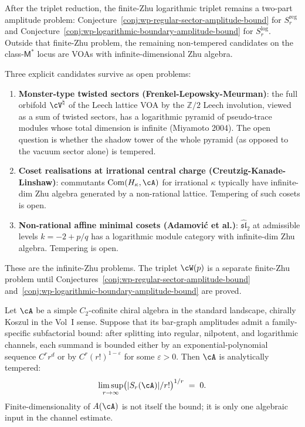 \begin{remark}
\label{rem:non-tempered-frontier-unbounded-zhu}
After the triplet reduction, the finite-Zhu logarithmic triplet remains
a two-part amplitude problem:
Conjecture~\ref{conj:wp-regular-sector-amplitude-bound} for
$S_r^{\mathrm{reg}}$ and
Conjecture~\ref{conj:wp-logarithmic-boundary-amplitude-bound} for
$S_r^{\log}$. Outside that finite-Zhu problem, the remaining
non-tempered candidates on the class-$\mathsf{M}^*$ locus are VOAs
with infinite-dimensional Zhu algebra.

Three explicit candidates survive as open problems:
\begin{enumerate}[nosep]
\item \textbf{Monster-type twisted sectors (Frenkel-Lepowsky-Meurman)}:
 the full orbifold $\cV^\natural$ of the Leech lattice VOA by the
 $\mathbb{Z} / 2$ Leech involution, viewed as a sum of twisted sectors,
 has a logarithmic pyramid of pseudo-trace modules whose total
 dimension is infinite (Miyamoto 2004). The open question
 is whether the shadow tower of the whole pyramid (as opposed to
 the vacuum sector alone) is tempered.
\item \textbf{Coset realisations at irrational central charge
 (Creutzig-Kanade-Linshaw)}: commutants
 $\mathrm{Com}(H_{\kappa}, \cA)$ for irrational $\kappa$ typically
 have infinite-dim Zhu algebra generated by a non-rational lattice.
 Tempering of such cosets is open.
\item \textbf{Non-rational affine minimal cosets
 (Adamovi\'c et al.)}: $\widehat{\mathfrak{sl}}_2$ at admissible
 levels $k = -2 + p/q$ has a logarithmic module category with
 infinite-dim Zhu algebra. Tempering is open.
\end{enumerate}
These are the infinite-Zhu problems. The triplet $\cW(p)$ is a
separate finite-Zhu problem until
Conjectures~\ref{conj:wp-regular-sector-amplitude-bound}
and~\ref{conj:wp-logarithmic-boundary-amplitude-bound} are proved.
\end{remark}

\begin{conjecture}
\label{conj:tempered-unbounded-zhu}
Let $\cA$ be a simple $C_2$-cofinite chiral algebra in the standard
landscape, chirally Koszul in the Vol~I sense. Suppose that its
bar-graph amplitudes admit a family-specific subfactorial bound: after
splitting into regular, nilpotent, and logarithmic channels, each
summand is bounded either by an exponential-polynomial sequence
$C^r r^d$ or by $C^r(r!)^{1-\varepsilon}$ for some
$\varepsilon>0$. Then $\cA$ is analytically tempered:
\[
 \limsup_{r \to \infty}
 \bigl( \lvert S_r(\cA) \rvert / r! \bigr)^{1/r}
 \;=\; 0.
\]
Finite-dimensionality of $A(\cA)$ is not itself the bound; it is only
one algebraic input in the channel estimate.
\end{conjecture}

